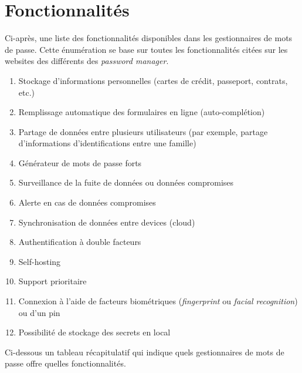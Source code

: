 \section{Fonctionnalités}
Ci-après, une liste des fonctionnalités disponibles dans les gestionnaires de mots de passe. Cette énumération se base sur toutes les fonctionnalités citées sur les websites des différents des \textit{password manager}. \\
\begin{enumerate}
\item Stockage d'informations personnelles (cartes de crédit, passeport, contrats, etc.)
\item Remplissage automatique des formulaires en ligne (auto-complétion)
\item Partage de données entre plusieurs utilisateurs (par exemple, partage d'informations d'identifications entre une famille)
\item Générateur de mots de passe forts
\item Surveillance de la fuite de données ou données compromises
\item Alerte en cas de données compromises
\item Synchronisation de données entre devices (cloud)
\item Authentification à double facteurs
\item Self-hosting
\item Support prioritaire
\item Connexion à l'aide de facteurs biométriques (\textit{fingerprint} ou \textit{facial recognition}) ou d'un pin
\item Possibilité de stockage des secrets en local

\end{enumerate}
Ci-dessous un tableau récapitulatif qui indique quels gestionnaires de mots de passe offre quelles fonctionnalités. 
